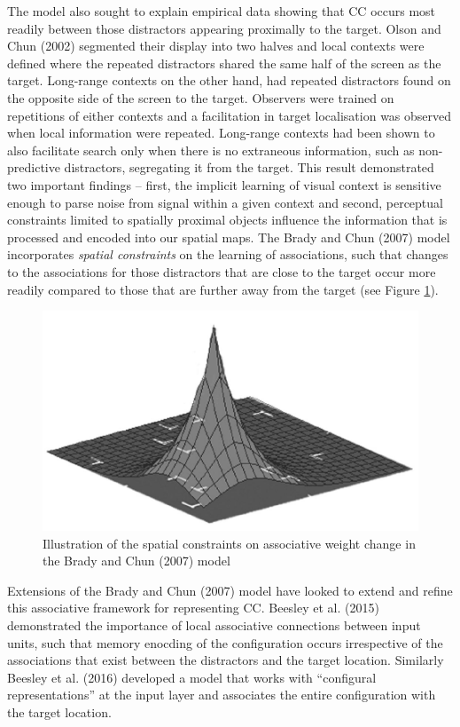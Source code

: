 \documentclass[
  english,
  man,floatsintext]{apa7}
\begin{document}
The model also sought to explain empirical data showing that CC occurs most readily between those distractors appearing proximally to the target. Olson and Chun (2002) segmented their display into two halves and local contexts were defined where the repeated distractors shared the same half of the screen as the target. Long-range contexts on the other hand, had repeated distractors found on the opposite side of the screen to the target. Observers were trained on repetitions of either contexts and a facilitation in target localisation was observed when local information were repeated. Long-range contexts had been shown to also facilitate search only when there is no extraneous information, such as non-predictive distractors, segregating it from the target. This result demonstrated two important findings -- first, the implicit learning of visual context is sensitive enough to parse noise from signal within a given context and second, perceptual constraints limited to spatially proximal objects influence the information that is processed and encoded into our spatial maps. The Brady and Chun (2007) model incorporates \emph{spatial constraints} on the learning of associations, such that changes to the associations for those distractors that are close to the target occur more readily compared to those that are further away from the target (see Figure \ref{fig:brady2007}).



\begin{figure}

{\centering \includegraphics[width=0.6\linewidth]{fig_Brady2007_SC} 

}

\caption{Illustration of the spatial constraints on associative weight change in the Brady and Chun (2007) model}\label{fig:brady2007}
\end{figure}

Extensions of the Brady and Chun (2007) model have looked to extend and refine this associative framework for representing CC. Beesley et al. (2015) demonstrated the importance of local associative connections between input units, such that memory enocding of the configuration occurs irrespective of the associations that exist between the distractors and the target location. Similarly Beesley et al. (2016) developed a model that works with ``configural representations'' at the input layer and associates the entire configuration with the target location.
\end{document}
